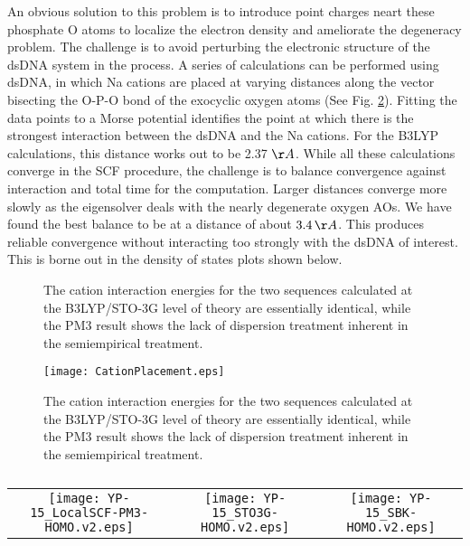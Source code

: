 An obvious solution to this problem is to introduce point
charges neart these phosphate O atoms to localize the electron density
and ameliorate the degeneracy problem.  The challenge is to avoid
perturbing the electronic structure of the dsDNA system in the
process.  A series of calculations can be performed using dsDNA, in which Na
cations are placed at varying distances along the vector bisecting
the O-P-O bond of the exocyclic oxygen atoms (See
Fig. \ref{Fig:Cation_Placement}).  Fitting the data points to a Morse
potential identifies the point at which there is the strongest
interaction between the dsDNA and the Na cations.  For the B3LYP
calculations, this distance works out to be 2.37 $\AA$.  While all
these calculations converge in the SCF procedure, the challenge is to
balance convergence against interaction and total time for the
computation.  Larger distances converge more slowly as the eigensolver
deals with the nearly degenerate oxygen AOs.  We have found the best
balance to be at a distance of about $3.4\,\AA$.  This produces
reliable convergence without interacting too strongly with the dsDNA
of interest.  This is borne out in the density of states plots shown below.

\begin{figure}[tb]

\caption{The cation interaction energies for the two sequences
  calculated at the B3LYP/STO-3G level of theory are essentially
  identical, while the PM3 result shows the lack of dispersion
  treatment inherent in the semiempirical treatment.
  \label{Fig:Cation_Placement}}
\end{figure}

\begin{figure}[tb]
\texttt{[image: CationPlacement.eps]}
\caption{The cation interaction energies for the two sequences
  calculated at the B3LYP/STO-3G level of theory are essentially
  identical, while the PM3 result shows the lack of dispersion
  treatment inherent in the semiempirical treatment.
  \label{Fig:Cation_Placement}}
\end{figure}

\begin{sidewaystable}
\centering
\begin{tabular}{ccc}
  \texttt{[image: YP-15\_LocalSCF-PM3-HOMO.v2.eps]}
  &
  \texttt{[image: YP-15\_STO3G-HOMO.v2.eps]} &
  \texttt{[image: YP-15\_SBK-HOMO.v2.eps]} \\
\end{tabular}
\caption{\label{Fig:LinearScalingOrbitals}}
\end{sidewaystable}


